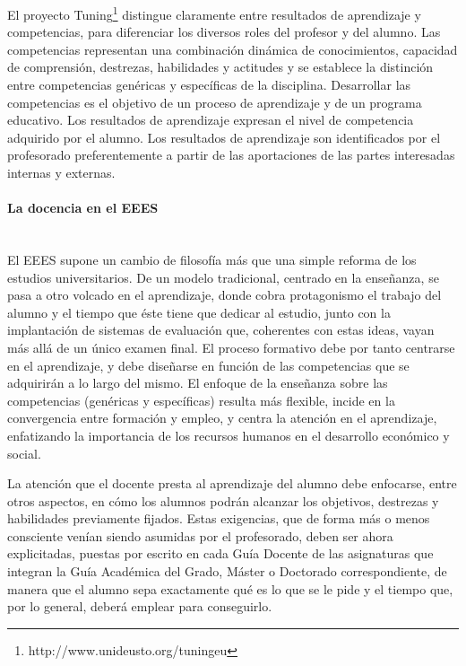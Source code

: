 El proyecto Tuning\footnote{http://www.unideusto.org/tuningeu} distingue claramente entre resultados de aprendizaje y competencias, para diferenciar los diversos roles del profesor y del alumno. Las competencias representan una combinación dinámica de conocimientos, capacidad de comprensión, destrezas, habilidades y actitudes y se establece la distinción entre competencias genéricas y específicas de la disciplina. Desarrollar las competencias es el objetivo de un proceso de aprendizaje y de un programa educativo. Los resultados de aprendizaje expresan el nivel de competencia adquirido por el alumno. Los resultados de aprendizaje son identificados por el profesorado preferentemente a partir de las aportaciones de las partes interesadas internas y externas.


\paragraph{La docencia en el EEES\\\\}

El EEES supone un cambio de filosofía más que una simple reforma de los estudios universitarios. De un modelo tradicional, centrado en la enseñanza, se pasa a otro volcado en el aprendizaje, donde cobra protagonismo el trabajo del alumno y el tiempo que éste tiene que dedicar al estudio, junto con la implantación de sistemas de evaluación que, coherentes con estas ideas, vayan más allá de un único examen final. El proceso formativo debe por tanto centrarse en el aprendizaje, y debe diseñarse en función de las competencias que se adquirirán a lo largo del mismo. El enfoque de la enseñanza sobre las competencias (genéricas y específicas) resulta más flexible, incide en la convergencia entre formación y empleo, y centra la atención en el aprendizaje, enfatizando la importancia de los recursos humanos en el desarrollo económico y social.

La atención que el docente presta al aprendizaje del alumno debe enfocarse, entre otros aspectos, en cómo los alumnos podrán alcanzar los objetivos, destrezas y habilidades previamente fijados. Estas exigencias, que de forma más o menos consciente venían siendo asumidas por el profesorado, deben ser ahora explicitadas, puestas por escrito en cada Guía Docente de las asignaturas que integran la Guía Académica del Grado, Máster o Doctorado correspondiente, de manera que el alumno sepa exactamente qué es lo que se le pide y el tiempo que, por lo general, deberá emplear para conseguirlo. 

